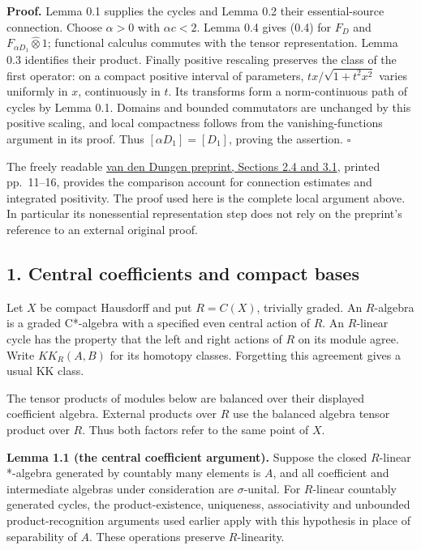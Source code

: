 \documentclass[
  11pt,
]{article}
\begin{document}
\textbf{Proof.} Lemma 0.1 supplies the cycles and Lemma 0.2 their
essential-source connection. Choose \(\alpha>0\) with \(\alpha c<2\).
Lemma 0.4 gives (0.4) for \(F_D\) and
\(F_{\alpha D_1}\widehat\otimes1\); functional calculus commutes with
the tensor representation. Lemma 0.3 identifies their product. Finally
positive rescaling preserves the class of the first operator: on a
compact positive interval of parameters, \(tx/\sqrt{1+t^2x^2}\) varies
uniformly in \(x\), continuously in \(t\). Its transforms form a
norm-continuous path of cycles by Lemma 0.1. Domains and bounded
commutators are unchanged by this positive scaling, and local
compactness follows from the vanishing-functions argument in its proof.
Thus \([\alpha D_1]=[D_1]\), proving the assertion. \(\square\)

The freely readable \href{https://arxiv.org/pdf/2006.10616v2}{van den
Dungen preprint, Sections 2.4 and 3.1}, printed pp.~11--16, provides the
comparison account for connection estimates and integrated positivity.
The proof used here is the complete local argument above. In particular
its nonessential representation step does not rely on the preprint's
reference to an external original proof.

\subsection{1. Central coefficients and compact
bases}\label{central-coefficients-and-compact-bases}

Let \(X\) be compact Hausdorff and put \(R=C(X)\), trivially graded. An
\(R\)-algebra is a graded C*-algebra with a specified even central
action of \(R\). An \(R\)-linear cycle has the property that the left
and right actions of \(R\) on its module agree. Write \(KK_R(A,B)\) for
its homotopy classes. Forgetting this agreement gives a usual KK class.

The tensor products of modules below are balanced over their displayed
coefficient algebra. External products over \(R\) use the balanced
algebra tensor product over \(R\). Thus both factors refer to the same
point of \(X\).

\textbf{Lemma 1.1 (the central coefficient argument).} Suppose the
closed \(R\)-linear *-algebra generated by countably many elements is
\(A\), and all coefficient and intermediate algebras under consideration
are \(\sigma\)-unital. For \(R\)-linear countably generated cycles, the
product-existence, uniqueness, associativity and unbounded
product-recognition arguments used earlier apply with this hypothesis in
place of separability of \(A\). These operations preserve
\(R\)-linearity.
\end{document}

